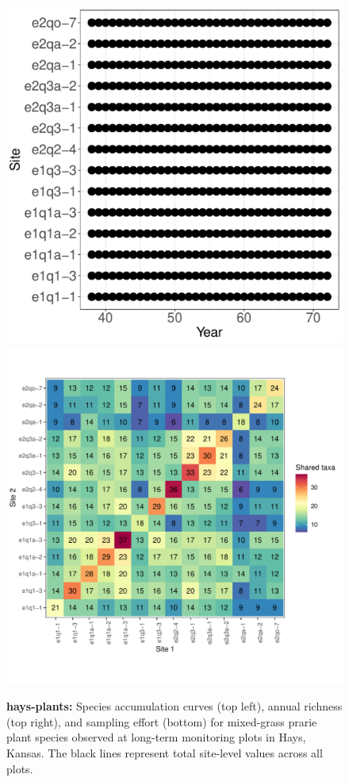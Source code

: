 \documentclass[11pt, oneside]{article}
\begin{document}
\begin{figure}[h!]
\includegraphics[scale = 0.4]{hays-plants-compagnoni_spatiotemporal_sampling_effort.pdf}
\includegraphics[scale = 0.4]{hays-plants-compagnoni_spp_shared.pdf}
\caption{{\bf hays-plants:} Species accumulation curves (top left),  annual richness (top right), and sampling effort (bottom)  for mixed-grass prarie plant species observed at long-term monitoring plots in Hays, Kansas. The black lines represent total site-level values across all plots.}
\label{hays-plants}
\end{figure}
\end{document}
